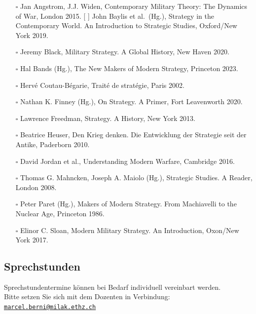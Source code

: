 {}\documentclass[a4paper]{article}
\providecommand{\tightlist}{\setlength{\itemsep}{1mm}\setlength{\parskip}{1mm}}
\begin{document}
\begin{itemize}
	\tightlist
	\item[$\square$]
	      Jan Angstrom, J.J. Widen, Contemporary Military Theory: The Dynamics
	      of War, London 2015. {[} {]} John Baylis et al.~(Hg.), Strategy in the
	      Contemporary World. An Introduction to Strategic Studies, Oxford/New
	      York 2019.
	\item[$\square$]
	      Jeremy Black, Military Strategy. A Global History, New Haven 2020.
	\item[$\square$]
	      Hal Bands (Hg.), The New Makers of Modern Strategy, Princeton 2023.
	\item[$\square$]
	      Hervé Coutau-Bégarie, Traité de stratégie, Paris 2002.
	\item[$\square$]
	      Nathan K. Finney (Hg.), On Strategy. A Primer, Fort Leavenworth 2020.
	\item[$\square$]
	      Lawrence Freedman, Strategy. A History, New York 2013.
	\item[$\square$]
	      Beatrice Heuser, Den Krieg denken. Die Entwicklung der Strategie seit
	      der Antike, Paderborn 2010.
	\item[$\square$]
	      David Jordan et al., Understanding Modern Warfare, Cambridge 2016.
	\item[$\square$]
	      Thomas G. Mahncken, Joseph A. Maiolo (Hg.), Strategic Studies. A
	      Reader, London 2008.
	\item[$\square$]
	      Peter Paret (Hg.), Makers of Modern Strategy. From Machiavelli to the
	      Nuclear Age, Princeton 1986.
	\item[$\square$]
	      Elinor C. Sloan, Modern Military Strategy. An Introduction, Oxon/New
	      York 2017.
\end{itemize}

\subsection{Sprechstunden}\label{sprechstunden}

Sprechstundentermine können bei Bedarf individuell vereinbart werden.\\
Bitte setzen Sie sich mit dem Dozenten in Verbindung:
\href{mailto:marcel.berni@milak.ethz.ch}{\nolinkurl{marcel.berni@milak.ethz.ch}}
\end{document}
